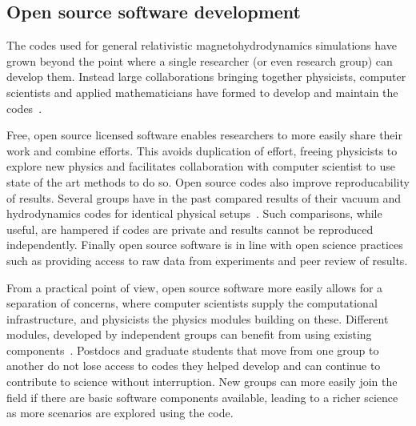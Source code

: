 \documentclass[12pt]{article}
\begin{document}
%
%

\subsection{Open source software development}

The codes used
for general relativistic magnetohydrodynamics simulations
have grown beyond the point where a single researcher (or even research group)
can
develop them. Instead large collaborations bringing together physicists,
computer scientists and applied mathematicians have formed to develop and
maintain the
codes~\cite{2012CQGra..29k5001L,SXS:web,astrocodelib:web}.

Free, open source licensed software enables researchers to more easily
share their work and combine efforts.
This avoids duplication of effort, freeing physicists to explore new physics
and facilitates collaboration with computer scientist to use state of the art
methods to do so.
%
Open source codes also improve reproducability of results. 
Several groups have in the past compared results of their vacuum
and hydrodynamics codes
for identical physical setups~\cite{Babiuc:2007vr,
Baiotti:2010ka}. Such comparisons, while useful, are hampered if codes are
private and results cannot be reproduced independently. Finally open source
software is in
line with open science practices such as providing access to raw data from
experiments and peer review of results. 

From a practical point of view, open source software more easily allows for a
separation of concerns, where computer scientists supply the computational
infrastructure, and physicists the physics modules building on these.
Different modules, developed by independent groups can benefit from using
existing components~\cite{2012CQGra..29k5001L}. Postdocs and graduate students that
move from one group to another do not lose access to codes they helped
develop and can continue to contribute to science without interruption.
New groups can more easily join the field if there are basic software
components available, leading to a richer science as more scenarios are
explored using the code. 
\end{document}
